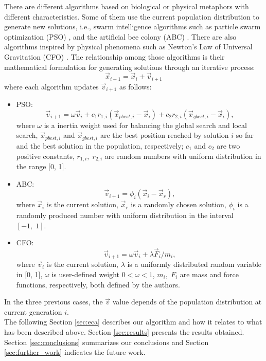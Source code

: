 \documentclass{svproc}
\begin{document}
There are different algorithms based on biological or physical metaphors with 
different characteristics. Some of them use the current population distribution 
to generate new solutions, i.e., swarm intelligence algorithms such as particle 
swarm optimization (PSO) \cite{pso1995}, and the artificial bee colony (ABC) \cite{abc2005}. 
There are also algorithms inspired by physical phenomena such as Newton's Law of 
Universal Gravitation (CFO) \cite{fisicaSurvey,cfo2007}. The relationship among those  
algorithms  is their mathematical formulation for generating solutions 
through an iterative process:
%
\begin{equation}
	\vec{x}_{i + 1} = \vec{x}_{i} + \vec{v}_{i + 1}
	\label{eqn:xxv}
\end{equation}
%
where each algorithm updates $\vec{v}_{i+1} $ as follows:
\begin{itemize}
	\item PSO:
		$$
			\vec{v}_{i + 1} = \omega \vec{v}_{i} +  
					c_1 r_{1, i} ( \vec{x}_{pbest, i} - \vec{x}_i ) + 
					c_2 r_{2, i} ( \vec{x}_{gbest, i} - \vec{x}_i ),
		$$
		where $\omega$ is a inertia weight used for balancing the global search 
		and local search, $\vec{x}_{pbest, i}$ and $\vec{x}_{gbest, i}$ are the 
		best position reached by solution $i$ so far and the best solution in the 
		population, respectively; $c_1$ and $c_2$ are two positive constants, $r_{1, i},\; r_{2, i}$ 
		are random numbers with uniform distribution in the range [0, 1].
	\item ABC:
		$$
			\vec{v}_{i + 1} = \phi_i (\vec{x}_i - \vec{x}_{r}),
		$$
	where $\vec{x}_i$ is the current solution, $\vec{x}_r$ is a randomly chosen 
	solution, $\phi_i$ is a randomly produced number with uniform distribution 
	in the interval $[-1,\;1]$.
	\item CFO: $$
		\vec{v}_{i + 1} = \omega \vec{v}_{i} + {\lambda \vec{F}_{i}} / {m_i},
		$$
		where $\vec{v}_{i}$ is the current solution, $\lambda$ is a uniformly 
		distributed random variable in [0, 1], $\omega$ 
		is user-defined weight $0 < \omega < 1$, $m_i,\; F_i$ are mass and force 
		functions, respectively, both defined by the authors.
\end{itemize}
%
%
In the three previous cases, the $\vec{v}$ value  depends of the population 
distribution at current generation $i$.\\

The following Section \ref{sec:eca} describes our algorithm and how it 
relates to what has been  described above. Section \ref{sec:results} 
presents the results obtained.  Section \ref{sec:conclusions} summarizes 
our conclusions and Section \ref{sec:further_work}  indicates the future work. 
\end{document}
